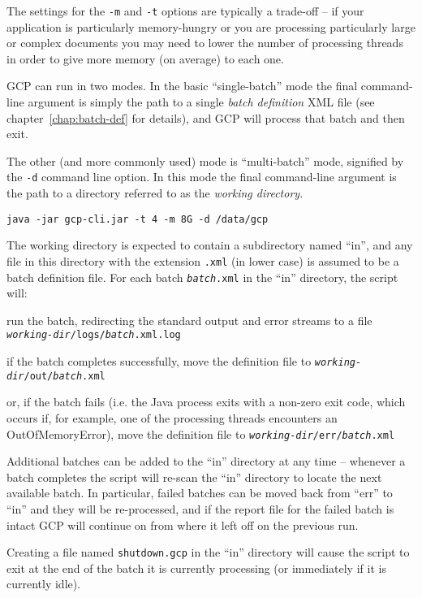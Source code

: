 The settings for the \verb!-m! and \verb!-t! options are typically a trade-off
-- if your application is particularly memory-hungry or you are processing
particularly large or complex documents you may need to lower the number of
processing threads in order to give more memory (on average) to each one.

GCP can run in two modes.  In the basic ``single-batch'' mode the final
command-line argument is simply the path to a single {\em batch definition} XML
file (see chapter~\ref{chap:batch-def} for details), and GCP will process that
batch and then exit.

The other (and more commonly used) mode is ``multi-batch'' mode, signified by
the \verb!-d! command line option.  In this mode the final command-line
argument is the path to a directory referred to as the {\em working directory}.
\begin{verbatim}
java -jar gcp-cli.jar -t 4 -m 8G -d /data/gcp
\end{verbatim}

The working directory is expected to contain a subdirectory named ``in'', and
any file in this directory with the extension \verb!.xml! (in lower case) is
assumed to be a batch definition file.  For each batch {\tt {\it batch}.xml} in
the ``in'' directory, the script will:

\bit
\item run the batch, redirecting the standard output and error streams to a
  file {\tt {\it working-dir}/logs/{\it batch}.xml.log}
\item if the batch completes successfully, move the definition file to
  {\tt {\it working-dir}/out/{\it batch}.xml}
\item or, if the batch fails (i.e. the Java process exits with a non-zero exit
  code, which occurs if, for example, one of the processing threads encounters
  an OutOfMemoryError), move the definition file to
  {\tt {\it working-dir}/err/{\it batch}.xml}
\eit

Additional batches can be added to the ``in'' directory at any time -- whenever
a batch completes the script will re-scan the ``in'' directory to locate the
next available batch.  In particular, failed batches can be moved back from
``err'' to ``in'' and they will be re-processed, and if the report file for the
failed batch is intact GCP will continue on from where it left off on the
previous run.

Creating a file named \verb!shutdown.gcp! in the ``in'' directory will cause
the script to exit at the end of the batch it is currently processing (or
immediately if it is currently idle).



